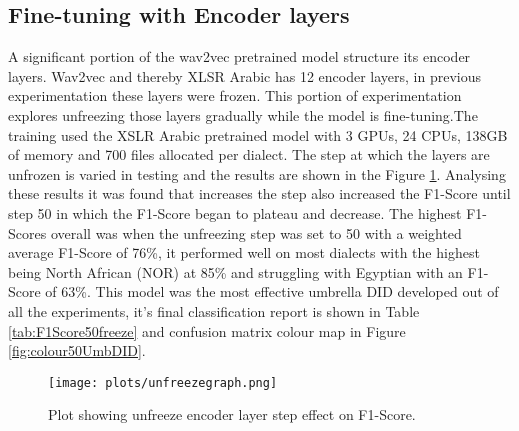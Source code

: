 \subsection{Fine-tuning with Encoder layers}\label{sect:encoderExp}
A significant portion of the wav2vec pretrained model structure its encoder layers. 
Wav2vec and thereby XLSR Arabic has 12 encoder layers, in previous experimentation these layers were frozen. This portion of experimentation  
explores unfreezing those layers gradually while the model is fine-tuning.The training used the XSLR Arabic pretrained model with 3 GPUs, 24 CPUs, 138GB of memory 
and 700 files allocated per dialect. The step at which the layers are unfrozen is varied 
in testing and the results are shown in the Figure \ref{fig:unfreezeplot}. Analysing these results it was found that increases the 
step also increased the F1-Score until step 50 in which the F1-Score began to plateau and decrease. 
The highest F1-Scores overall was when the unfreezing step was set to 50 with a weighted average F1-Score of 76\%, it performed well on most dialects 
with the highest being North African (NOR) at 85\% and struggling with Egyptian with an F1-Score of 63\%. This model was the most effective umbrella DID developed out of 
all the experiments, it's final classification report is shown in Table \ref{tab:F1Score50freeze} and confusion matrix colour map in Figure \ref{fig:colour50UmbDID}. 

\begin{figure}[h!]
    \centering
    \texttt{[image: plots/unfreezegraph.png]}
    \caption{Plot showing unfreeze encoder layer step effect on F1-Score. }
    \label{fig:unfreezeplot}
\end{figure}

